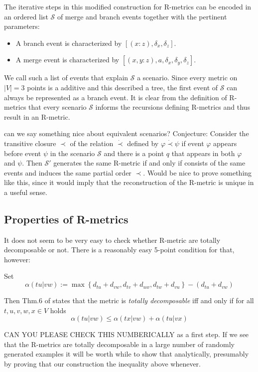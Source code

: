 \documentclass{article}
\newcommand{\TODO}[1]{\begingroup\color{red}#1\endgroup}
\begin{document}
The iterative steps in this modified construction for R-metrics can be
encoded in an ordered list $\mathcal{S}$ of merge and branch
events together with the pertinent parameters: \\
\begin{itemize} 
  \item[] A branch event is characterized by $[(x:z),\delta_x,\delta_z]$.
  \item[] A merge event is characterized by
    $[(x,y:z),a,\delta_x,\delta_y,\delta_z]$.
\end{itemize} 
We call such a list of events that explain $\mathcal{S}$ a scenario. 
Since every metric on $|V|=3$ points is a additive and this described a
tree, the first event of $\mathcal{S}$ can always be represented as a
branch event. It is clear from the definition of R-metrics that every
scenario $\mathcal{S}$ informs the recursions defining R-metrics and thus
result in an R-metric. 

\TODO{can we say something nice about equivalent scenarios? Conjecture:
  Consider the transitive closure $\prec$ of the relation $\dot\prec$
  defined by $\varphi\dot\prec\psi$ if event $\varphi$ appears before event
  $\psi$ in the scenario $\mathcal{S}$ and there is a point $q$ that
  appears in both $\varphi$ and $\psi$. Then $\mathcal{S}'$ generates the
  same R-metric if and only if consists of the same events and induces the
  same partial order $\prec$. Would be nice to prove something like this,
  since it would imply that the reconstruction of the R-metric is unique in
  a useful sense.} 


\subsection*{Properties of R-metrics} 


\TODO{It does not seem to be very easy to check whether R-metric are 
totally decomposable or not. There is a reasonably easy 5-point condition
for that, however:

Set 
\begin{equation} 
  \alpha(tu|vw) := 
  \max\left\{ d_{tu}+d_{vw}, d_{tv}+d_{uw}, d_{tw}+d_{vu} \right\} -
             (d_{tu}+d_{vw})
\end{equation} 

Then Thm.6 of \cite{Bandelt:92} states that the metric is \emph{totally
  decomposable} iff and only if for all $t,u,v,w,x\in V$ holds 
\begin{equation} 
  \alpha(tu|vw) \le \alpha(tx|vw)+\alpha(tu|vx)
\end{equation} 

CAN YOU PLEASE CHECK THIS NUMBERICALLY as a first step. If we see that the 
R-metrics are totally decomposable in a large number of randomly generated
examples it will be worth while to show that analytically, presumably by 
proving that our construction the inequality above whenever.
}
\end{document}
